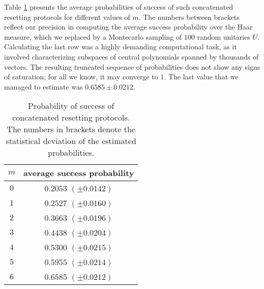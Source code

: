 \documentclass[twocolumn,prx,aps,longbibliography]{revtex4-1}
\begin{document}
Table \ref{rereset} presents the average probabilities of success of such concatenated resetting protocols for different values of $m$. The numbers between brackets reflect our precision in computing the average success probability over the Haar measure, which we replaced by a Montecarlo sampling of $100$ random unitaries $U$. Calculating the last row was a highly demanding computational task, as it involved characterizing subspaces of central polynomials spanned by thousands of vectors. The resulting truncated sequence of probabilities does not show any signs of saturation; for all we know, it may converge to $1$. The last value that we managed to estimate was $0.6585 \pm 0.0212$.



\begin{table}[tp]
\begin{tabular}{cc}
$m$ & average success probability\\
\hline
$0$ & $0.2053$ $(\pm 0.0142)$\\
$1$ & $0.2527$ $(\pm 0.0160)$\\
$2$ & $0.3663$ $(\pm 0.0196)$\\
$3$ & $0.4438$ $(\pm 0.0204)$\\
$4$ & $0.5300$ $(\pm 0.0215)$\\
$5$ & $0.5955$ $(\pm 0.0214)$\\
$6$ & $0.6585$ $(\pm 0.0212)$
\end{tabular}
\caption{Probability of success of concatenated resetting protocols. The numbers in brackets denote the statistical deviation of the estimated probabilities.}
\label{rereset}
\end{table}
\end{document}
